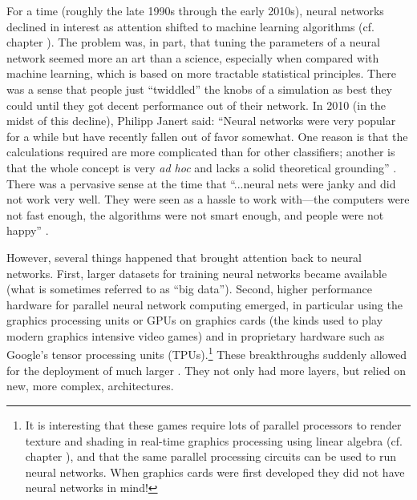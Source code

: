 For a time (roughly the late 1990s through the early 2010s), neural networks declined in interest as attention shifted to machine learning algorithms (cf. chapter ). The problem was, in part, that tuning the parameters of a neural network seemed more an art than a science, especially when compared with machine learning, which is based on more tractable statistical principles. There was a sense that people just ``twiddled''  the knobs of a simulation as best they could until they got decent performance out of their network. In 2010 (in the midst of this decline), Philipp Janert said: ``Neural networks were very popular for a while but have recently fallen out of favor somewhat. One reason is that the calculations required are more complicated than for other classifiers; another is that the whole concept is very \emph{ad hoc} and lacks a solid theoretical grounding'' \cite[Ch. 18]{janert2010data}.  There was a pervasive sense at the time that ``...neural nets were janky and did not work very well. They were seen as a hassle to work with---the computers were not fast enough, the algorithms were not smart enough, and people were not happy'' \cite{kurenkov2020briefhistory}.

However, several things happened that brought attention back to neural networks. First, larger datasets for training neural networks became available (what is sometimes referred to as ``big data''). Second, higher performance hardware for parallel neural network computing emerged, in particular using the graphics processing units or GPUs on graphics cards (the kinds used to play modern graphics intensive video games) and in proprietary hardware such as Google's tensor processing units (TPUs).\footnote{It is interesting that these games require lots of parallel processors to render texture and shading in real-time graphics processing using linear algebra (cf. chapter ), and that the same parallel processing circuits can be used to run neural networks. When graphics cards were first developed they did not have neural networks in mind!} These breakthroughs suddenly allowed for the deployment of much larger . They not only had more layers, but relied on new, more complex, architectures.


